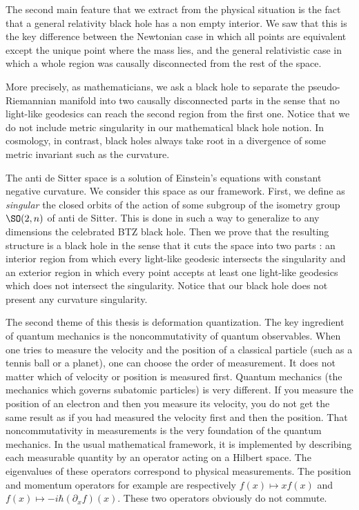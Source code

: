 The second main feature that we extract from the physical situation is the fact that a general relativity black hole has a non empty interior. We saw that this is the key difference between the Newtonian case in which all points are equivalent except the unique point where the mass lies, and the general relativistic case in which a whole region was causally disconnected from the rest of the space.

More precisely, as mathematicians, we ask a black hole to separate the pseudo-Riemannian manifold into two causally disconnected parts in the sense that no light-like geodesics can reach the second region from the first one. Notice that we do not include metric singularity in our mathematical black hole notion. In cosmology, in contrast, black holes always take root in a divergence of some metric invariant such as the curvature.

The anti de Sitter space is a solution of Einstein's equations with constant negative curvature. We consider this space as our framework. First, we define as \emph{singular} the closed orbits of the action of some subgroup of the isometry group $\SO(2,n)$ of anti de Sitter. This is done in such a way to generalize to any dimensions the celebrated BTZ black hole. Then we prove that the resulting structure is a black hole in the sense that it cuts the space into two parts : an interior region from which every light-like geodesic intersects the singularity and an exterior region in which every point accepts at least one light-like geodesics which does not intersect the singularity.  Notice that our black hole does not present any curvature singularity.

The second theme of this thesis is deformation quantization. The key ingredient of quantum mechanics is the noncommutativity of quantum observables. When one tries to measure the velocity and the position of a classical particle (such as a tennis ball or a planet), one can choose the order of measurement. It does not matter which of velocity or position is measured first. Quantum mechanics (the mechanics which governs subatomic particles) is very different. If you measure the position of an electron and then you measure its velocity, you do not get the same result as if you had measured the velocity first and then the position. That noncommutativity in measurements is the very foundation of the quantum mechanics. In the usual mathematical framework, it is implemented by describing each measurable quantity by an operator acting on a Hilbert space. The eigenvalues of these operators correspond to physical measurements. The position and momentum operators for example are respectively $f(x)\mapsto xf(x)$ and $f(x)\mapsto -i\hbar(\partial_xf)(x)$. These two operators obviously do not commute.

